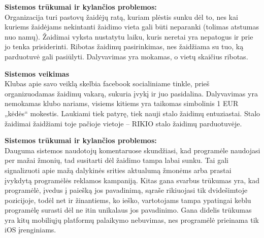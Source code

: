 \documentclass{VUMIFPSkursinis}
\begin{document}
			\textbf{Sistemos trūkumai ir kylančios problemos:}\\
			Organizacija turi pastovų žaidėjų ratą, kuriam plėstis sunku dėl to, 
			nes kai kuriems žaidėjams nekintanti žaidimo vieta gali būti neparanki 
			(tolimas atstumas nuo namų). Žaidimai vyksta nustatytu laiku, kuris 
			neretai yra nepatogus ir prie jo tenka prisiderinti. Ribotas žaidimų 
			pasirinkimas, nes žaidžiama su tuo, ką parduotuvė gali pasiūlyti. 
			Dalyvavimas yra mokamas, o vietų skaičius ribotas.
				
			\textbf{Sistemos veikimas}\\
			Klubas apie savo veiklą skelbia facebook socialiniame tinkle, prieš 
			organizuodamas žaidimų vakarą, sukuria įvykį ir juo pasidalina. 
			Dalyvavimas yra nemokamas klubo nariams, visiems kitiems yra taikomas 
			simbolinis 1 EUR „kėdės“ mokestis. Laukiami tiek patyrę, tiek nauji 
			stalo žaidimų entuziastai. Stalo žaidimai žaidžiami toje pačioje vietoje 
			– RIKIO stalo žaidimų parduotuvėje.
			
			\textbf{Sistemos trūkumai ir kylančios problemos:}\\
			Dauguma sistemos naudotojų komentaruose skundžiasi, kad programėle 
			naudojasi per mažai žmonių, tad susitarti dėl žaidimo tampa labai sunku. 
			Tai gali signalizuoti apie mažą dalykinės srities aktualumą žmonėms arba
			prastai įvykdytą programėlės reklamos kampaniją. Kitas gana svarbus 
			trūkumas yra, kad programėlė, įvedus į paiešką jos pavadinimą, sąraše 
			rikiuojasi tik dvidešimtoje pozicijoje, todėl net ir žinantiems, ko 
			ieško, vartotojams tampa ypatingai keblu programėlę surasti dėl ne itin 
			unikalaus jos pavadinimo. Gana didelis trūkumas yra kitų mobiliųjų 
			platformų palaikymo nebuvimas, nes programėlė prieinama tik iOS įrenginiams.
\end{document}
